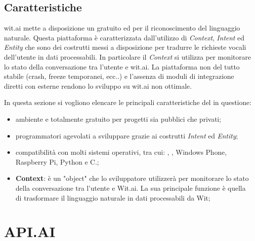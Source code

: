 \documentclass[a4paper,titlepage]{article}
\begin{document}
		\subsection{Caratteristiche}

			wit.ai mette a disposizione un  gratuito ed  per il riconoscimento del linguaggio naturale. Questa piattaforma è caratterizzata dall'utilizzo di \textit{Context}, \textit{Intent} ed \textit{Entity} che sono dei costrutti messi a disposizione per tradurre le richieste vocali dell'utente in dati processabili. In particolare il \textit{Context} si utilizza per monitorare lo stato della conversazione tra l'utente e wit.ai.
			La piattaforma non del tutto stabile (crash, freeze temporanei, ecc..) e l'assenza di moduli di integrazione diretti con  esterne rendono lo sviluppo su wit.ai non ottimale.

In questa sezione si vogliono elencare le principali caratteristiche del  in questione:
\begin{itemize}
	\item ambiente  e totalmente gratuito per progetti sia pubblici che privati;
	\item programmatori agevolati a sviluppare grazie ai costrutti \textit{Intent} ed \textit{Entity}; 
	\item compatibilità con molti sistemi operativi, tra cui: , , Windows Phone, Raspberry Pi, Python e C.;
	\item \textbf{Context}: è un "object" che lo sviluppatore utilizzerà per monitorare lo stato della conversazione tra l'utente e Wit.ai. La sua principale funzione è quella di trasformare il linguaggio naturale in dati processabili da Wit;	
\end{itemize}	

		
\newpage
\section{API.AI}
\end{document}
